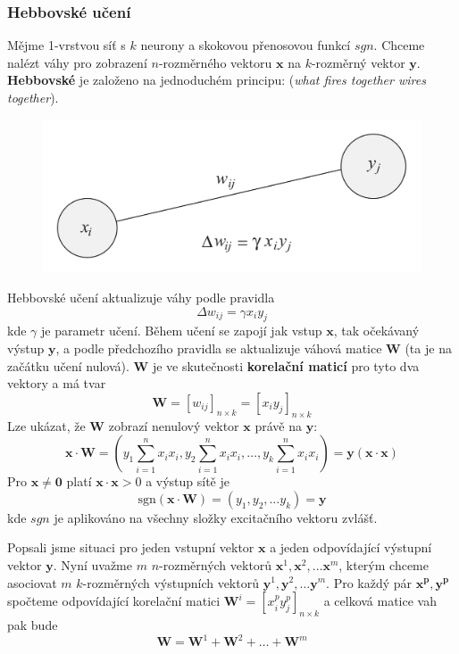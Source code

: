 \documentclass[11pt]{report} %
\renewcommand{\vec}[1]{\mathbf{#1}}
\numberwithin{equation}{section}
\begin{document}
\subsubsection{Hebbovské učení}
Mějme 1-vrstvou síť s $k$ neurony a skokovou přenosovou funkcí $sgn$. Chceme nalézt váhy pro zobrazení $n$-rozměrného vektoru $\vec{x}$ na $k$-rozměrný vektor $\vec{y}$. \textbf{Hebbovské} je založeno na jednoduchém principu:  (\textit{what fires together wires together}).
\begin{figure}[H]
	\centering
	\includegraphics[scale = 0.6]{img/hebb_rule.png}
\end{figure}

Hebbovské učení aktualizuje váhy podle pravidla
$$\Delta w_{ij} = \gamma x_i y_j$$
kde $\gamma$ je parametr učení. Během učení se zapojí jak vstup $\vec{x}$, tak očekávaný výstup $\vec{y}$, a podle předchozího pravidla se aktualizuje váhová matice $\vec{W}$ (ta je na začátku učení nulová). $\vec{W}$ je ve skutečnosti \textbf{korelační maticí} pro tyto dva vektory a má tvar
$$\vec{W} = [w_{ij}]_{n\times k} = [x_iy_j]_{n\times k} $$
Lze ukázat, že $\vec{W}$ zobrazí nenulový vektor $\vec{x}$ právě na $\vec{y}$:
$$\vec{x}\cdot \vec{W} = \left(y_1 \sum\limits_{i=1}^{n} x_ix_i,y_2 \sum\limits_{i=1}^{n} x_ix_i, \dots, y_k \sum\limits_{i=1}^{n} x_ix_i \right) = \vec{y} (\vec{x}\cdot \vec{x})$$
Pro $\vec{x} \neq \vec{0}$ platí $\vec{x} \cdot \vec{x} > 0$ a výstup sítě je 
$$\text{sgn}(\vec{x}\cdot \vec{W}) = (y_1, y_2, \dots y_k) = \vec{y}$$
kde $sgn$ je aplikováno na všechny složky excitačního vektoru zvlášť.

Popsali jsme situaci pro jeden vstupní vektor $\vec{x}$ a jeden odpovídající výstupní vektor $\vec{y}$. Nyní uvažme $m$ $n$-rozměrných vektorů $\vec{x}^1, \vec{x}^2, \dots \vec{x}^m$, kterým chceme asociovat $m$ $k$-rozměrných výstupních vektorů $\vec{y}^1, \vec{y}^2,\dots\vec{y}^m$. Pro každý pár $\vec{x^p}, \vec{y^p}$ spočteme odpovídající korelační matici $\vec{W}^i = [x_i^p y_j^p]_{n\times k}$ a celková matice vah pak bude
$$\vec{W} = \vec{W}^1 + \vec{W}^2 + \dots + \vec{W}^m$$
\end{document}
